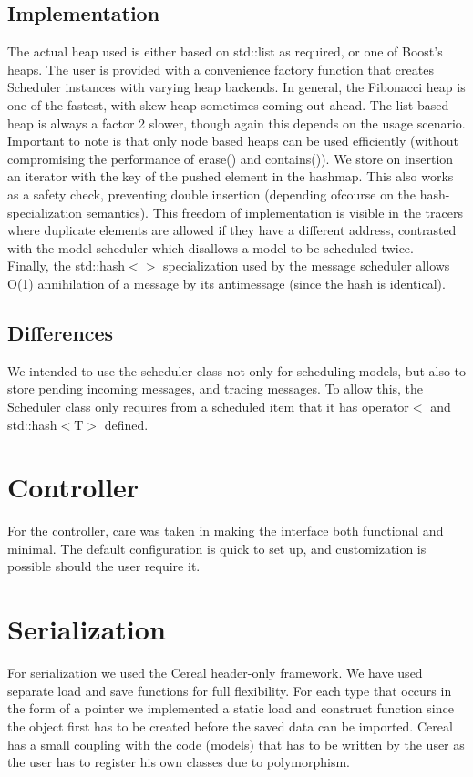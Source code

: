\documentclass[8pt,a4paper]{report}
\begin{document}
\subsection{Implementation}
The actual heap used is either based on std::list as required, or one of Boost's heaps. The user is provided with a convenience factory function that creates Scheduler instances with varying heap backends. In general, the Fibonacci heap is one of the fastest, with skew heap sometimes coming out ahead. The list based heap is always a factor 2 slower, though again this depends on the usage scenario. \\Important to note is that only node based heaps can be used efficiently (without compromising the performance of erase() and contains()). We store on insertion an iterator with the key of the pushed element in the hashmap. This also works as a safety check, preventing double insertion (depending ofcourse on the hash-specialization semantics). This freedom of implementation is visible in the tracers where duplicate elements are allowed if they have a different address, contrasted with the model scheduler which disallows a model to be scheduled twice.\\
Finally, the std::hash$<>$ specialization used by the message scheduler allows O(1) annihilation of a message by its antimessage (since the hash is identical).
\subsection{Differences}
We intended to use the scheduler class not only for scheduling models, but also to store pending incoming messages, and tracing messages. To allow this, the Scheduler class only requires from a scheduled item that it has operator$<$ and std::hash$<$T$>$ defined.

\section{Controller}
For the controller, care was taken in making the interface both functional and minimal. The default configuration is quick to set up, and customization is possible should the user require it.

\section{Serialization}
For serialization we used the Cereal \cite{cereal} header-only framework. We have used separate load and save functions for full flexibility. For each type that occurs in the form of a pointer we implemented a static load and construct function since the object first has to be created before the saved data can be imported. Cereal has a small coupling with the code (models) that has to be written by the user as the user has to register his own classes due to polymorphism.
\end{document}

